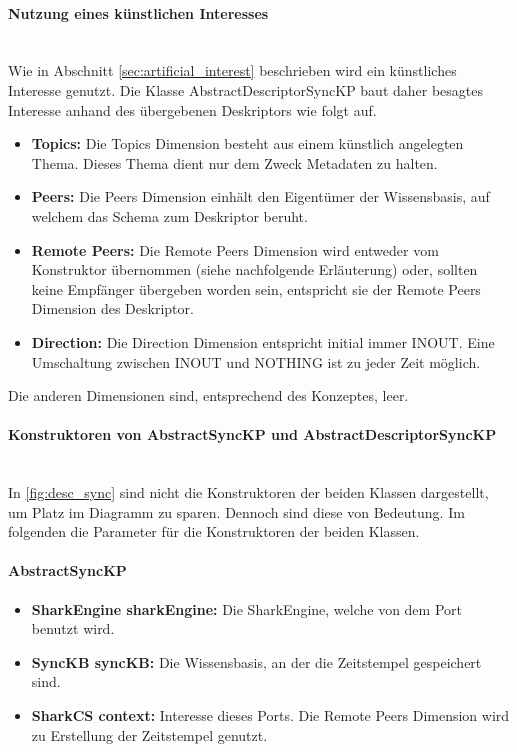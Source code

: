\documentclass[a4paper]{article}
\begin{document}
	\paragraph{Nutzung eines künstlichen Interesses}\mbox{} \\
	
	Wie in Abschnitt \ref{sec:artificial_interest} beschrieben wird ein künstliches
	Interesse genutzt. Die Klasse AbstractDescriptorSyncKP baut daher besagtes
	Interesse anhand des übergebenen Deskriptors wie folgt auf. 
	
	\begin{itemize}
		\item \textbf{Topics:} Die Topics Dimension besteht aus einem künstlich
		angelegten Thema. Dieses Thema dient nur dem Zweck Metadaten zu halten.
		\item \textbf{Peers:} Die Peers Dimension einhält den Eigentümer der
		Wissensbasis, auf welchem das Schema zum Deskriptor beruht.
		\item \textbf{Remote Peers:} Die Remote Peers Dimension wird entweder
		vom Konstruktor übernommen (siehe nachfolgende Erläuterung) oder, sollten
		keine Empfänger übergeben worden sein, entspricht sie der Remote Peers
		Dimension des Deskriptor.
		\item \textbf{Direction:} Die Direction Dimension entspricht initial
		immer INOUT. Eine Umschaltung zwischen INOUT und NOTHING ist zu jeder Zeit
		möglich.
	\end{itemize}
	
	Die anderen Dimensionen sind, entsprechend des Konzeptes, leer.
	
	\paragraph{Konstruktoren von AbstractSyncKP und AbstractDescriptorSyncKP}
	\mbox{} \\
	
	In \autoref{fig:desc_sync} sind nicht die Konstruktoren der beiden Klassen
	dargestellt, um Platz im Diagramm zu sparen. Dennoch sind diese von Bedeutung.
	Im folgenden die Parameter für die Konstruktoren der beiden Klassen.
	
	\paragraph{AbstractSyncKP}
	
	\begin{itemize}
		\item \textbf{SharkEngine sharkEngine:} Die SharkEngine, welche von
		dem Port benutzt wird.
		\item \textbf{SyncKB syncKB:} Die Wissensbasis, an der die Zeitstempel
		 gespeichert sind.
		\item \textbf{SharkCS context:} Interesse dieses Ports. Die Remote Peers
		Dimension wird zu Erstellung der Zeitstempel genutzt.
	\end{itemize}
	
\end{document}
